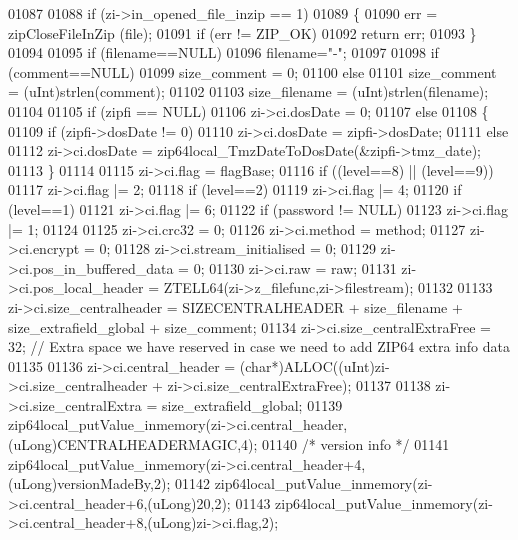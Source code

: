 \begin{DoxyCode}
01087 
01088     \textcolor{keywordflow}{if} (zi->in\_opened\_file\_inzip == 1)
01089     \{
01090         err = zipCloseFileInZip (file);
01091         \textcolor{keywordflow}{if} (err != ZIP\_OK)
01092             \textcolor{keywordflow}{return} err;
01093     \}
01094 
01095     \textcolor{keywordflow}{if} (filename==NULL)
01096         filename=\textcolor{stringliteral}{"-"};
01097 
01098     \textcolor{keywordflow}{if} (comment==NULL)
01099         size\_comment = 0;
01100     \textcolor{keywordflow}{else}
01101         size\_comment = (uInt)strlen(comment);
01102 
01103     size\_filename = (uInt)strlen(filename);
01104 
01105     \textcolor{keywordflow}{if} (zipfi == NULL)
01106         zi->ci.dosDate = 0;
01107     \textcolor{keywordflow}{else}
01108     \{
01109         \textcolor{keywordflow}{if} (zipfi->dosDate != 0)
01110             zi->ci.dosDate = zipfi->dosDate;
01111         \textcolor{keywordflow}{else}
01112           zi->ci.dosDate = zip64local\_TmzDateToDosDate(&zipfi->tmz\_date);
01113     \}
01114 
01115     zi->ci.flag = flagBase;
01116     \textcolor{keywordflow}{if} ((level==8) || (level==9))
01117       zi->ci.flag |= 2;
01118     \textcolor{keywordflow}{if} (level==2)
01119       zi->ci.flag |= 4;
01120     \textcolor{keywordflow}{if} (level==1)
01121       zi->ci.flag |= 6;
01122     \textcolor{keywordflow}{if} (password != NULL)
01123       zi->ci.flag |= 1;
01124 
01125     zi->ci.crc32 = 0;
01126     zi->ci.method = method;
01127     zi->ci.encrypt = 0;
01128     zi->ci.stream\_initialised = 0;
01129     zi->ci.pos\_in\_buffered\_data = 0;
01130     zi->ci.raw = raw;
01131     zi->ci.pos\_local\_header = ZTELL64(zi->z\_filefunc,zi->filestream);
01132 
01133     zi->ci.size\_centralheader = SIZECENTRALHEADER + size\_filename + size\_extrafield\_global + size\_comment;
01134     zi->ci.size\_centralExtraFree = 32; \textcolor{comment}{// Extra space we have reserved in case we need to add ZIP64 extra
       info data}
01135 
01136     zi->ci.central\_header = (\textcolor{keywordtype}{char}*)ALLOC((uInt)zi->ci.size\_centralheader + zi->ci.size\_centralExtraFree);
01137 
01138     zi->ci.size\_centralExtra = size\_extrafield\_global;
01139     zip64local\_putValue\_inmemory(zi->ci.central\_header,(uLong)CENTRALHEADERMAGIC,4);
01140     \textcolor{comment}{/* version info */}
01141     zip64local\_putValue\_inmemory(zi->ci.central\_header+4,(uLong)versionMadeBy,2);
01142     zip64local\_putValue\_inmemory(zi->ci.central\_header+6,(uLong)20,2);
01143     zip64local\_putValue\_inmemory(zi->ci.central\_header+8,(uLong)zi->ci.flag,2);

\end{DoxyCode}
